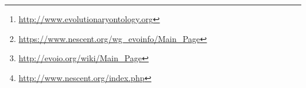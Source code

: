 \documentclass[10pt]{bmc_article}
\newenvironment{bmcformat}{\begin{raggedright}\baselineskip20pt\sloppy\setboolean{publ}{false}}{\end{raggedright}\baselineskip20pt\sloppy}
\begin{document}
\begin{bmcformat}
\begin{abstract}
	\paragraph*{Background:} The Comparative Data Analysis Ontology
\footnote{\url{http://www.evolutionaryontology.org}} is an ontology developed,
as part of the
EvoInfo\footnote{\url{https://www.nescent.org/wg_evoinfo/Main_Page}} and
EvoIO\footnote{\url{http://evoio.org/wiki/Main_Page}} groups supported by
NESCent\footnote{\url{http://www.nescent.org/index.php}},  to provide semantics
to the descriptions of data and transformations commonly found in the domain of
phylogenetic inference. The core concepts of the ontology enables the
description of phylogenetic trees and associated character data matrices.

     

 
        \paragraph*{Results:} Text for this section of the abstract \ldots

        \paragraph*{Conclusions:} Text for this section of the abstract \ldots
\end{abstract}












\end{bmcformat}
\end{document}
